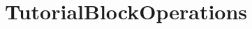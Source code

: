 \hypertarget{group___tutorial_block_operations}{}\section{Tutorial\+Block\+Operations}
\label{group___tutorial_block_operations}

